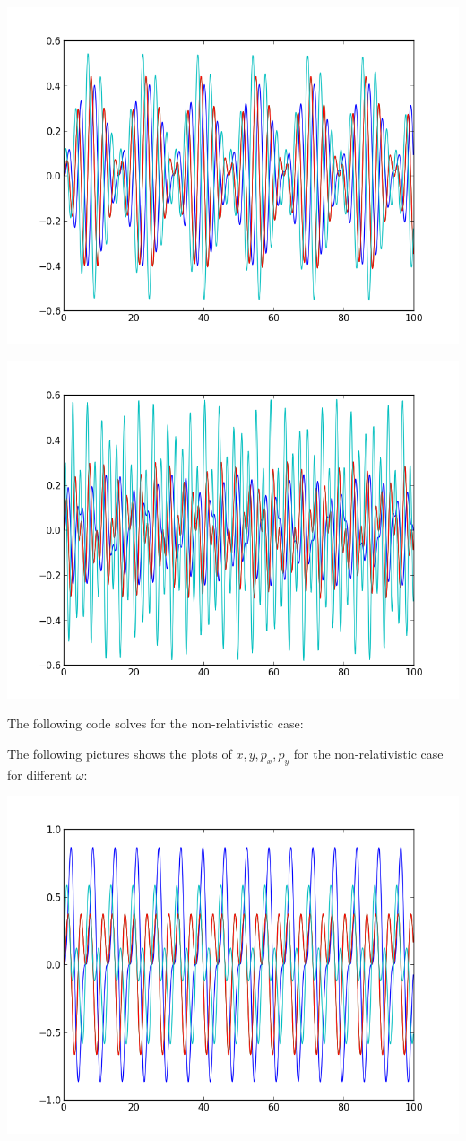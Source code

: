 \documentclass[%
]
{scrartcl}
\theoremstyle{plain}
\begin{document}
\begin{center}
\centering
\includegraphics[width=0.6\linewidth]{../cyclotronsRelativistic_o2_a03.png}
\end{center}

\begin{center}
\centering
\includegraphics[width=0.6\linewidth]{../cyclotronsRelativistic_o3_a1.png}
\end{center}

The following code solves for the non-relativistic case:



The following pictures shows the plots of $x,y,p_{x},p_{y}$ for the non-relativistic case for different $\omega$:

\begin{center}
\centering
\includegraphics[width=0.6\linewidth]{../cyclotronsNonRelativistic_o1.png}
\end{center}
\end{document}
